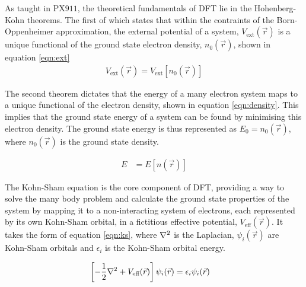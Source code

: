 \documentclass[10pt,a4paper,twocolumn,twoside]{extarticle}
\begin{document}
As taught in PX$911$, the theoretical fundamentals of DFT lie in the Hohenberg-Kohn theorems.
The first of which states that within the contraints of the Born-Oppenheimer approximation, the external potential of a system, $V_{\text{ext}}(\vec{r})$ is a unique functional of the ground state electron density, $n_0(\vec{r})$, shown in equation \ref{eqn:ext}
\begin{align}
	\label{eqn:ext}
	V_{\text{ext}}(\vec{r}) = V_{\text{ext}}[n_0(\vec{r})] 
\end{align}

The second theorem dictates that the energy of a many electron system maps to a unique functional of the electron density, shown in equation \ref{eqn:density}. This implies that the ground state energy of a system can be found  by minimising this electron density. The ground state energy is thus represented as ${E_0 = n_0(\vec{r})}$, where $n_0(\vec{r})$ is the ground state density.  

\begin{align}
	\label{eqn:density}
	E &= E[n(\vec{r})]
\end{align}




The Kohn-Sham equation is the core component of DFT, providing a way to solve the many body problem and calculate the ground state properties of the system by mapping it to a non-interacting system of electrons, each represented by its own Kohn-Sham orbital, in a fictitious effective potential, $V_\text{eff}(\vec{r})$. It takes the form of equation \ref{eqn:ks}, where $\laplacian$ is the Laplacian, $\psi_i(\vec{r})$ are Kohn-Sham orbitals and $\epsilon_i$ is the Kohn-Sham orbital energy. 

\begin{align}
	\left[-\frac{1}{2}\laplacian + V_\text{eff}(\vec{r})\right]\psi_i(\vec{r}) &= \epsilon_i \psi_i(\vec{r}) 	
	\label{eqn:ks}
\end{align}
\end{document}
